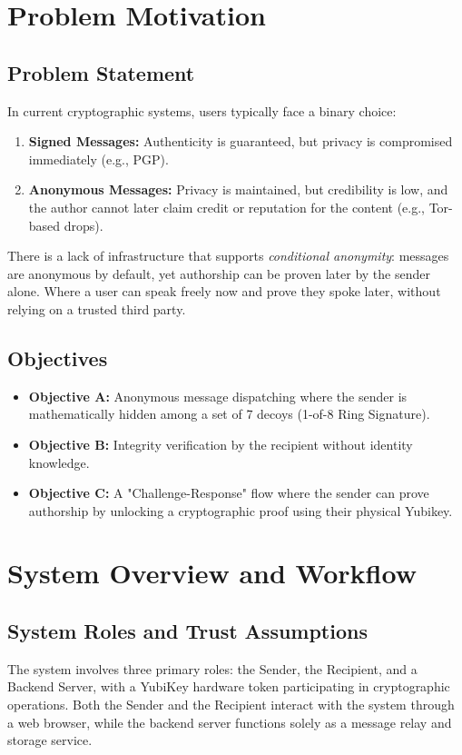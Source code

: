 \documentclass[letterpaper,11pt]{article}
\begin{document}
\newpage

\section{Problem Motivation}

\subsection{Problem Statement}
In current cryptographic systems, users typically face a binary choice:
\begin{enumerate}
    \item \textbf{Signed Messages:} Authenticity is guaranteed, but privacy is compromised immediately (e.g., PGP).
    \item \textbf{Anonymous Messages:} Privacy is maintained, but credibility is low, and the author cannot later claim credit or reputation for the content (e.g., Tor-based drops).
\end{enumerate}
There is a lack of infrastructure that supports \textit{conditional anonymity}: messages are anonymous by default, yet authorship can be proven later by the sender alone. Where a user can speak freely now and prove they spoke later, without relying on a trusted third party.

\subsection{Objectives}
\begin{itemize}
    \item \textbf{Objective A:} Anonymous message dispatching where the sender is mathematically hidden among a set of 7 decoys (1-of-8 Ring Signature).
    \item \textbf{Objective B:} Integrity verification by the recipient without identity knowledge.
    \item \textbf{Objective C:} A "Challenge-Response" flow where the sender can prove authorship by unlocking a cryptographic proof using their physical Yubikey.
\end{itemize}

\section{System Overview and Workflow}

\subsection{System Roles and Trust Assumptions}
The system involves three primary roles: the Sender, the Recipient, and a Backend Server, with a YubiKey hardware token participating in cryptographic operations. Both the Sender and the Recipient interact with the system through a web browser, while the backend server functions solely as a message relay and storage service.
\end{document}
